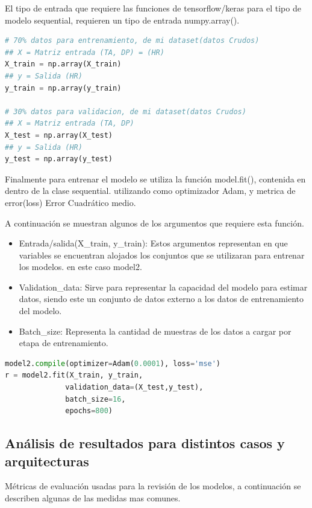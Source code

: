 El tipo de entrada que requiere las funciones de tensorflow/keras para el tipo
de modelo sequential, requieren un tipo de entrada numpy.array().
\begin{lstlisting}[language=Python, caption=Adecuación de los vectores de entrada usando numpy]
# 70% datos para entrenamiento, de mi dataset(datos Crudos)
## X = Matriz entrada (TA, DP) = (HR)
X_train = np.array(X_train)
## y = Salida (HR)
y_train = np.array(y_train)

# 30% datos para validacion, de mi dataset(datos Crudos)
## X = Matriz entrada (TA, DP)
X_test = np.array(X_test)
## y = Salida (HR)
y_test = np.array(y_test)

\end{lstlisting}

Finalmente para entrenar el modelo se utiliza la función model.fit(), contenida
en dentro de la clase sequential. utilizando como optimizador Adam, y metrica
de error(loss) Error Cuadrático medio.

A continuación se muestran algunos de los argumentos que requiere esta función.

\begin{itemize}\itemsep=-5px
    \item Entrada/salida(X\_train, y\_train): Estos argumentos representan en
        que variables se encuentran alojados los conjuntos que se utilizaran
        para entrenar los modelos. en este caso model2.
    \item Validation\_data: Sirve para representar la capacidad del modelo para
        estimar datos, siendo este un conjunto de datos externo a los datos de
        entrenamiento del modelo.
    \item Batch\_size: Representa la cantidad de muestras de los datos a cargar
        por etapa de entrenamiento.
\end{itemize}
\begin{lstlisting}[language=Python, caption=Funcion para entramiento]
model2.compile(optimizer=Adam(0.0001), loss='mse')
r = model2.fit(X_train, y_train,
              validation_data=(X_test,y_test),
              batch_size=16,
              epochs=800)
\end{lstlisting}
\subsection{Análisis de resultados para distintos casos y arquitecturas}

Métricas de evaluación usadas para la revisión de los modelos, a continuación
se describen algunas de las medidas mas comunes. 

